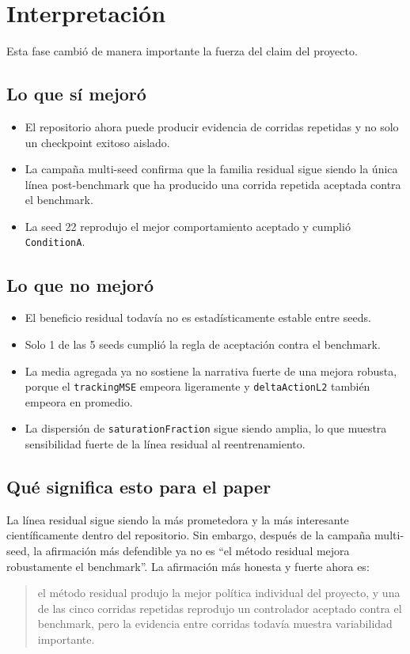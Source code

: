 \documentclass[11pt,a4paper]{article}
\begin{document}
\section*{Interpretaci\'on}
Esta fase cambi\'o de manera importante la fuerza del claim del proyecto.

\subsection*{Lo que s\'i mejor\'o}
\begin{itemize}
    \item El repositorio ahora puede producir evidencia de corridas repetidas y no solo un checkpoint exitoso aislado.
    \item La campa\~na multi-seed confirma que la familia residual sigue siendo la \'unica l\'inea post-benchmark que ha producido una corrida repetida aceptada contra el benchmark.
    \item La seed 22 reprodujo el mejor comportamiento aceptado y cumpli\'o \texttt{ConditionA}.
\end{itemize}

\subsection*{Lo que no mejor\'o}
\begin{itemize}
    \item El beneficio residual todav\'ia no es estad\'isticamente estable entre seeds.
    \item Solo 1 de las 5 seeds cumpli\'o la regla de aceptaci\'on contra el benchmark.
    \item La media agregada ya no sostiene la narrativa fuerte de una mejora robusta, porque el \texttt{trackingMSE} empeora ligeramente y \texttt{deltaActionL2} tambi\'en empeora en promedio.
    \item La dispersi\'on de \texttt{saturationFraction} sigue siendo amplia, lo que muestra sensibilidad fuerte de la l\'inea residual al reentrenamiento.
\end{itemize}

\subsection*{Qu\'e significa esto para el paper}
La l\'inea residual sigue siendo la m\'as prometedora y la m\'as interesante cient\'ificamente dentro del repositorio. Sin embargo, despu\'es de la campa\~na multi-seed, la afirmaci\'on m\'as defendible ya no es ``el m\'etodo residual mejora robustamente el benchmark''. La afirmaci\'on m\'as honesta y fuerte ahora es:
\begin{quote}
el m\'etodo residual produjo la mejor pol\'itica individual del proyecto, y una de las cinco corridas repetidas reprodujo un controlador aceptado contra el benchmark, pero la evidencia entre corridas todav\'ia muestra variabilidad importante.
\end{quote}
\end{document}
